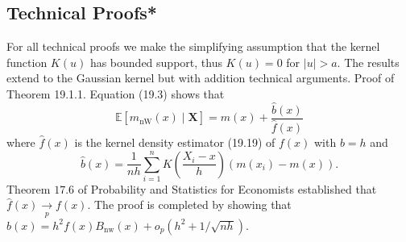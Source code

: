 \documentclass[10pt]{article}
\begin{document}
\subsection{Technical Proofs*}
For all technical proofs we make the simplifying assumption that the kernel function $K(u)$ has bounded support, thus $K(u)=0$ for $|u|>a$. The results extend to the Gaussian kernel but with addition technical arguments. Proof of Theorem 19.1.1. Equation (19.3) shows that
$$
\mathbb{E}\left[\widehat{m}_{\mathrm{nW}}(x) \mid \boldsymbol{X}\right]=m(x)+\frac{\widehat{b}(x)}{\widehat{f}(x)}
$$
where $\widehat{f}(x)$ is the kernel density estimator (19.19) of $f(x)$ with $b=h$ and
$$
\widehat{b}(x)=\frac{1}{n h} \sum_{i=1}^{n} K\left(\frac{X_{i}-x}{h}\right)\left(m\left(x_{i}\right)-m(x)\right) .
$$
Theorem $17.6$ of Probability and Statistics for Economists established that $\widehat{f}(x) \underset{p}{\longrightarrow} f(x)$. The proof is completed by showing that $\widehat{b}(x)=h^{2} f(x) B_{\mathrm{nw}}(x)+o_{p}\left(h^{2}+1 / \sqrt{n h}\right)$.
\end{document}
